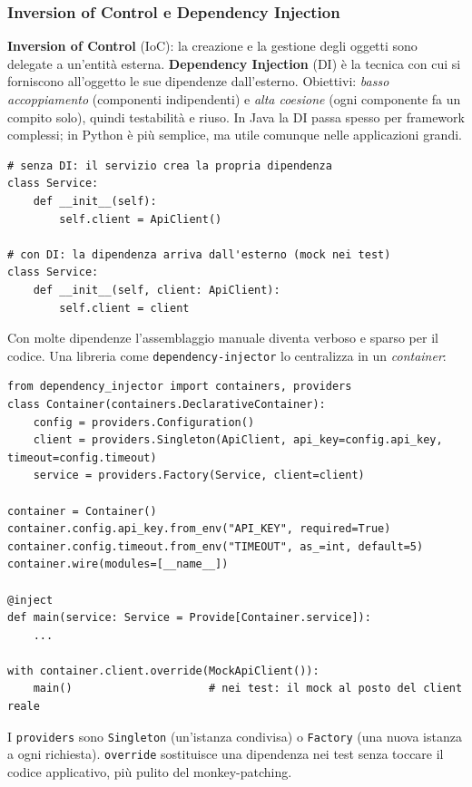 \documentclass[a4paper,12pt]{article}
\begin{document}
\subsubsection{Inversion of Control e Dependency Injection}
\textbf{Inversion of Control} (IoC): la creazione e la gestione degli oggetti sono delegate a
un'entità esterna. \textbf{Dependency Injection} (DI) è la tecnica con cui si forniscono
all'oggetto le sue dipendenze dall'esterno. Obiettivi: \emph{basso accoppiamento}
(componenti indipendenti) e \emph{alta coesione} (ogni componente fa un compito solo), quindi
testabilità e riuso. In Java la DI passa spesso per framework complessi; in Python è più
semplice, ma utile comunque nelle applicazioni grandi.
\begin{verbatim}
# senza DI: il servizio crea la propria dipendenza
class Service:
    def __init__(self):
        self.client = ApiClient()

# con DI: la dipendenza arriva dall'esterno (mock nei test)
class Service:
    def __init__(self, client: ApiClient):
        self.client = client
\end{verbatim}
Con molte dipendenze l'assemblaggio manuale diventa verboso e sparso per il codice. Una
libreria come \texttt{dependency-injector} lo centralizza in un \emph{container}:
\begin{verbatim}
from dependency_injector import containers, providers
class Container(containers.DeclarativeContainer):
    config = providers.Configuration()
    client = providers.Singleton(ApiClient, api_key=config.api_key, timeout=config.timeout)
    service = providers.Factory(Service, client=client)

container = Container()
container.config.api_key.from_env("API_KEY", required=True)
container.config.timeout.from_env("TIMEOUT", as_=int, default=5)
container.wire(modules=[__name__])

@inject
def main(service: Service = Provide[Container.service]):
    ...

with container.client.override(MockApiClient()):
    main()                     # nei test: il mock al posto del client reale
\end{verbatim}
I \texttt{providers} sono \texttt{Singleton} (un'istanza condivisa) o \texttt{Factory} (una nuova
istanza a ogni richiesta). \texttt{override} sostituisce una dipendenza nei test senza toccare il
codice applicativo, più pulito del monkey-patching.
\end{document}

